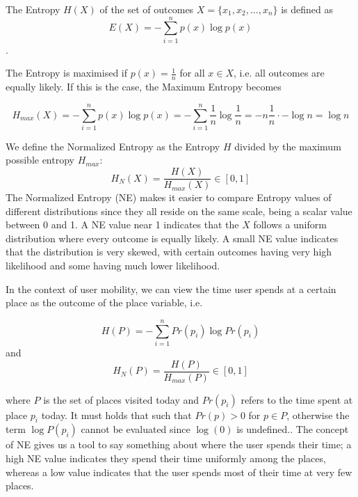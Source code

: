 The Entropy $H(X)$ of the set of outcomes $X = \{x_1, x_2, ..., x_n\}$ is defined as
$$E(X) = -\sum_{i=1}^{n} p(x) \log p(x)$$. 

The Entropy is maximised if $p(x) = \frac{1}{n}$ for all $x \in X$, i.e. all outcomes are equally likely. If this is the case, the Maximum Entropy becomes 


$$H_{max}(X) = - \sum_{i=1}^{n} p(x) \log p(x) = - \sum_{i=1}^{n} \frac{1}{n} \log \frac{1}{n} = -n \frac{1}{n} \cdot -\log n = \log n $$

We define the Normalized Entropy as the Entropy $H$ divided by the maximum possible entropy $H_{max}$:
$$H_N(X) = \frac{H(X)}{H_{max}(X)} \in [0,1]$$
The Normalized Entropy (NE) makes it easier to compare Entropy values of different distributions since they all reside on the same scale, being a scalar value between  0 and 1. A NE value near 1 indicates that the $X$ follows a uniform distribution where every outcome is equally likely. A small NE value indicates that the distribution is very skewed, with certain outcomes having very high likelihood and some having much lower likelihood. 

In the context of user mobility, we can view the time user spends at a certain place as the outcome of the place variable, i.e. 

$$H(P) = - \sum_{i=1}^{n} Pr(p_i) \log Pr(p_i)$$ and
$$H_N(P) = \frac{H(P)}{H_{max}(P)} \in [0,1]$$

where $P$ is the set of places visited today and $Pr(p_i)$ refers to the time spent at place $p_i$ today. It must holds that such that $Pr(p) > 0$ for $p \in P$, otherwise the term $\log P(p_i)$ cannot be evaluated since $\log(0)$ is undefined.. The concept of NE gives us a tool to say something about where the user spends their time; a high NE value indicates they spend their time uniformly among the places, whereas a low value indicates that the user spends most of their time at very few places. 

